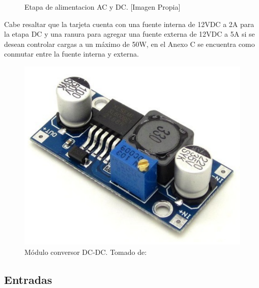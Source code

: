 		\begin{figure}[H]
			\centering
			\caption[Etapa de alimentacion AC y DC.]{Etapa de alimentacion AC y DC. [Imagen Propia]}
			\label{fig:balidc}
		\end{figure}
		
		Cabe resaltar que la tarjeta cuenta con una fuente interna de 12VDC a 2A para la etapa DC y una ranura para agregar una fuente externa de 12VDC a 5A si se desean controlar cargas a un máximo de 50W, en el Anexo C se encuentra como conmutar entre la fuente interna y externa.\\
			
		\begin{figure}[H]
			\centering
			\caption[Módulo conversor DC-DC.]{Módulo conversor DC-DC. Tomado de: \cite{DCDC}}
			\label{fig:DCDC}
			\includegraphics[width=0.35\linewidth]{Imagenes/DCDC}
		\end{figure}
	
	\subsection{Entradas}
	
